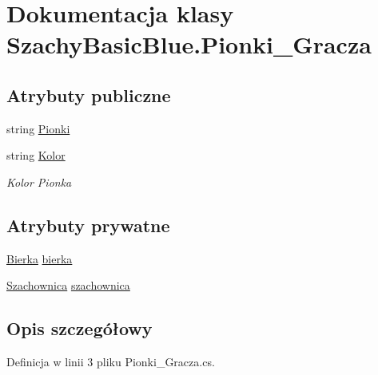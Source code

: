 \hypertarget{class_szachy_basic_blue_1_1_pionki___gracza}{\section{Dokumentacja klasy Szachy\-Basic\-Blue.\-Pionki\-\_\-\-Gracza}
\label{class_szachy_basic_blue_1_1_pionki___gracza}
}
\subsection*{Atrybuty publiczne}
\begin{DoxyCompactItemize}
\item 
string \hyperlink{class_szachy_basic_blue_1_1_pionki___gracza_af92a1285e98224184d83bcc77ba69e9f}{Pionki}
\item 
string \hyperlink{class_szachy_basic_blue_1_1_pionki___gracza_af6f6c6b9f0068cedae2da45843fa4a11}{Kolor}
\begin{DoxyCompactList}\small\item\em Kolor Pionka \end{DoxyCompactList}\end{DoxyCompactItemize}
\subsection*{Atrybuty prywatne}
\begin{DoxyCompactItemize}
\item 
\hyperlink{class_szachy_basic_blue_1_1_bierka}{Bierka} \hyperlink{class_szachy_basic_blue_1_1_pionki___gracza_ae84a422688851904d03ae1753bd11771}{bierka}
\item 
\hyperlink{class_szachy_basic_blue_1_1_szachownica}{Szachownica} \hyperlink{class_szachy_basic_blue_1_1_pionki___gracza_aa9823f1f70be577121fa7956e143858d}{szachownica}
\end{DoxyCompactItemize}


\subsection{Opis szczegółowy}


Definicja w linii 3 pliku Pionki\-\_\-\-Gracza.\-cs.



